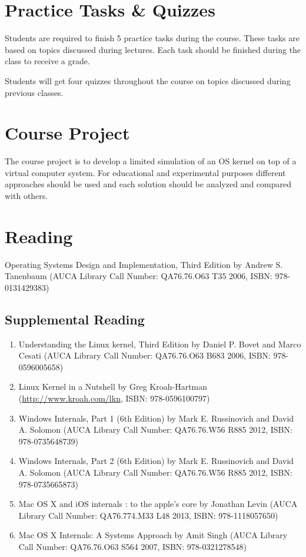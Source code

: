 \documentclass[12pt,a4paper,oneside]{article}
\begin{document}
    \section{Practice Tasks \& Quizzes}

        Students are required to finish 5 practice tasks during the course. These tasks are based on topics discussed during lectures. Each task should be finished during the class to receive a grade.

        Students will get four quizzes throughout the course on topics discussed during previous classes.

    \section{Course Project}

        The course project is to develop a limited simulation of an OS kernel on top of a virtual computer system. For educational and experimental purposes different approaches should be used and each solution should be analyzed and compared with others.

    \section{Reading}

        Operating Systems Design and Implementation, Third Edition by Andrew S. Tanenbaum (AUCA Library Call Number: QA76.76.O63 T35 2006, ISBN: 978-0131429383)

        \subsection{Supplemental Reading}
            \begin{enumerate}
                \item Understanding the Linux kernel, Third Edition by Daniel P. Bovet and Marco Cesati (AUCA Library Call Number: QA76.76.O63 B683 2006, ISBN: 978-0596005658)
                \item Linux Kernel in a Nutshell by Greg Kroah-Hartman (\url{http://www.kroah.com/lkn}, ISBN: 978-0596100797)
                \item Windows Internals, Part 1 (6th Edition) by Mark E. Russinovich and David A. Solomon (AUCA Library Call Number: QA76.76.W56 R885 2012, ISBN: 978-0735648739)
                \item Windows Internals, Part 2 (6th Edition) by Mark E. Russinovich and David A. Solomon (AUCA Library Call Number: QA76.76.W56 R885 2012, ISBN: 978-0735665873)
                \item Mac OS X and iOS internals : to the apple's core by Jonathan Levin (AUCA Library Call Number: QA76.774.M33 L48 2013, ISBN: 978-1118057650)
                \item Mac OS X Internals: A Systems Approach by Amit Singh (AUCA Library Call Number: QA76.76.O63 S564 2007, ISBN: 978-0321278548)
            \end{enumerate}
\end{document}
